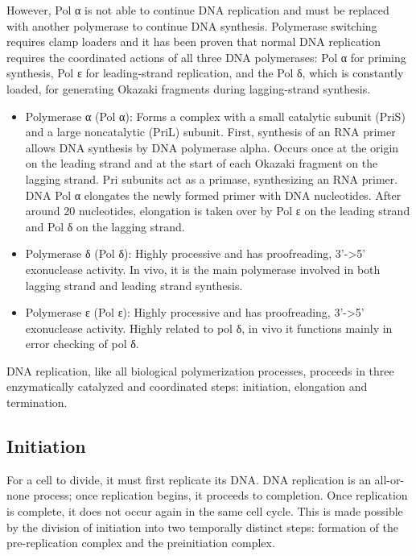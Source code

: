 However, Pol α is not able to continue DNA replication and must be replaced with another polymerase to continue DNA synthesis. Polymerase switching requires clamp loaders and it has been proven that normal DNA replication requires the coordinated actions of all three DNA polymerases: Pol α for priming synthesis, Pol ε for leading-strand replication, and the Pol δ, which is constantly loaded, for generating Okazaki fragments during lagging-strand synthesis.

\begin{itemize}
\tightlist
\item
  Polymerase α (Pol α): Forms a complex with a small catalytic subunit (PriS) and a large noncatalytic (PriL) subunit. First, synthesis of an RNA primer allows DNA synthesis by DNA polymerase alpha. Occurs once at the origin on the leading strand and at the start of each Okazaki fragment on the lagging strand. Pri subunits act as a primase, synthesizing an RNA primer. DNA Pol α elongates the newly formed primer with DNA nucleotides. After around 20 nucleotides, elongation is taken over by Pol ε on the leading strand and Pol δ on the lagging strand.
\item
  Polymerase δ (Pol δ): Highly processive and has proofreading, 3'-\textgreater5' exonuclease activity. In vivo, it is the main polymerase involved in both lagging strand and leading strand synthesis.
\item
  Polymerase ε (Pol ε): Highly processive and has proofreading, 3'-\textgreater5' exonuclease activity. Highly related to pol δ, in vivo it functions mainly in error checking of pol δ.
\end{itemize}

DNA replication, like all biological polymerization processes, proceeds in three enzymatically catalyzed and coordinated steps: initiation, elongation and termination.

\hypertarget{initiation}{%
\subsection{Initiation}\label{initiation}}

For a cell to divide, it must first replicate its DNA. DNA replication is an all-or-none process; once replication begins, it proceeds to completion. Once replication is complete, it does not occur again in the same cell cycle. This is made possible by the division of initiation into two temporally distinct steps: formation of the pre-replication complex and the preinitiation complex.

